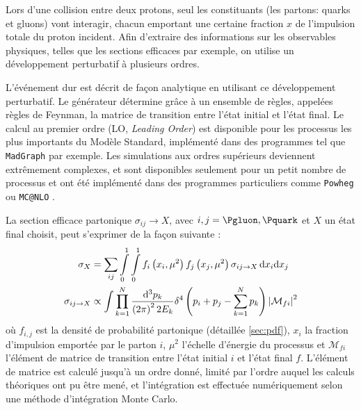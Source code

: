 Lors d'une collision entre deux protons, seul les constituants (les partons: quarks et gluons) vont interagir, chacun emportant une certaine fraction $x$ de l'impulsion totale du proton incident. Afin d'extraire des informations sur les observables physiques, telles que les sections efficaces par exemple, on utilise un développement perturbatif à plusieurs ordres.

L'événement dur est décrit de façon analytique en utilisant ce développement perturbatif. Le générateur détermine grâce à un ensemble de règles, appelées règles de Feynman, la matrice de transition entre l'état initial et l'état final. Le calcul au premier ordre (LO, \emph{Leading Order}) est disponible pour les processus les plus importants du Modèle Standard, implémenté dans des programmes tel que \texttt{MadGraph} \citep{madgraph} par exemple. Les simulations aux ordres supérieurs deviennent extrêmement complexes, et sont disponibles seulement pour un petit nombre de processus et ont été implémenté dans des programmes particuliers comme \texttt{Powheg} \citep{Alioli:2010xd} ou \texttt{MC@NLO} \citep{1126-6708-2002-06-029}.

La section efficace partonique $\sigma_{ij} \rightarrow X$, avec $i, j = \Pgluon, \Pquark$ et $X$ un état final choisit, peut s'exprimer de la façon suivante :
\begin{align}
  \sigma_{X} &= \sum_{ij} \int \displaylimits_0^1 \int \displaylimits_0^1 f_i\left( x_i, \mu^2 \right) f_j\left(x_j, \mu^2\right) \sigma_{ij \rightarrow X}\, \mathrm{d}x_i \mathrm{d}x_j \notag \\
  \sigma_{ij \rightarrow X} &\propto \int \prod \displaylimits_{k = 1}^{N} \frac{\mathrm{d}^3p_k}{\left( 2 \pi \right)^2 2 E_k} \delta^4\left( p_i + p_j - \sum_{k = 1}^{N} p_k \right) \left| \mathcal{M}_{fi} \right|^2 \label{eq:section_efficace}
\end{align}
où $f_{i, j}$ est la densité de probabilité partonique (détaillée \cref{sec:pdf}), $x_i$ la fraction d'impulsion emportée par le parton $i$, $\mu^2$ l'échelle d'énergie du processus et $\mathcal{M}_{fi}$ l'élément de matrice de transition entre l'état initial $i$ et l'état final $f$. L'élément de matrice est calculé jusqu'à un ordre donné, limité par l'ordre auquel les calculs théoriques ont pu être mené, et l'intégration est effectuée numériquement selon une méthode d'intégration Monte Carlo.

